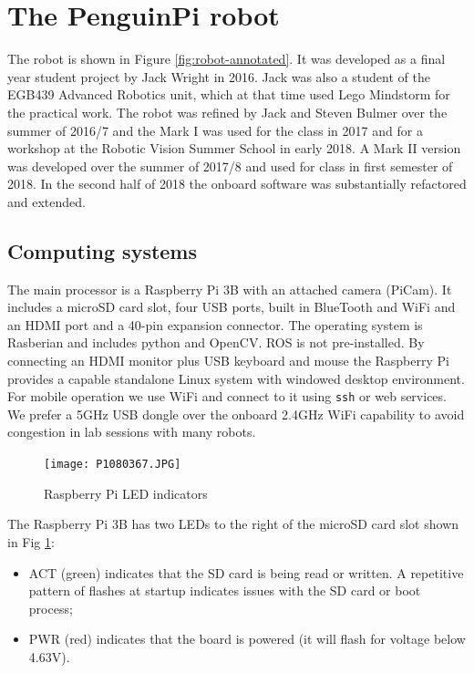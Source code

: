 \documentclass[11pt,fleqn]{article}
\begin{document}
\section{The PenguinPi robot}
The robot is shown in Figure \ref{fig:robot-annotated}.
It was developed as a final year student project by Jack Wright in 2016.
Jack was also a student of the EGB439 Advanced Robotics
unit, which at that time used Lego Mindstorm for the practical work.
The robot was refined by Jack and Steven Bulmer over the summer of 2016/7 and the Mark I was used for
the class in 2017 and for a workshop at the Robotic Vision Summer School in early 2018.
A Mark II version was developed over the summer of 2017/8 and used for  class in first semester of 2018.
In the second half of 2018 the onboard software was substantially refactored and extended.


\subsection{Computing systems}
The main processor is a Raspberry Pi 3B with an attached camera (PiCam). 
It includes a microSD card slot, four USB ports, built in BlueTooth and WiFi and an HDMI port and a 40-pin expansion connector.
The operating system is Rasberian and includes python and OpenCV.  ROS is not pre-installed.
By connecting an HDMI monitor plus USB keyboard and mouse the Raspberry Pi provides a capable standalone Linux system with windowed desktop environment.
For mobile operation we use WiFi and connect to it using \texttt{ssh} or web services.
We prefer a 5\unit{GHz} USB dongle over the onboard 2.4\unit{GHz} WiFi capability to avoid congestion in lab sessions with many 
robots.

\begin{figure}
\centering
\texttt{[image: P1080367.JPG]}
\caption{Raspberry Pi LED indicators}\label{fig:pi-leds}
\end{figure}

The Raspberry Pi 3B has two LEDs to the right of the microSD card slot shown in Fig \ref{fig:pi-leds}:
\begin{itemize}
\item ACT (green) indicates that the SD card is being read or written.  A repetitive pattern of flashes at startup indicates issues
with the SD card or boot process;
\item PWR (red) indicates that the board is powered (it will flash for voltage below 4.63\unit{V}).
\end{itemize}
\end{document}
